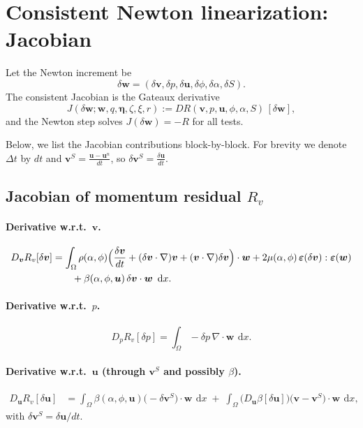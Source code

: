 \documentclass[11pt]{article}
\newcommand{\dd}{\,\mathrm{d}}
\newcommand{\grad}{\nabla}
\newcommand{\divv}{\nabla\!\cdot}
\newcommand{\eps}{\bm{\varepsilon}}
\begin{document}
\section{Consistent Newton linearization: Jacobian}

Let the Newton increment be
\[
\delta\bm{w} = (\delta\bm{v},\delta p,\delta\bm{u},\delta\phi,\delta\alpha,\delta S).
\]
The consistent Jacobian is the Gateaux derivative
\[
\boxed{
J(\delta\bm{w};\bm{w},q,\bm{\eta},\zeta,\xi,r)
:= D R(\bm{v},p,\bm{u},\phi,\alpha,S)\,[\delta\bm{w}],
}
\]
and the Newton step solves $J(\delta\bm{w}) = -R$ for all tests.

Below, we list the Jacobian contributions block-by-block. For brevity we denote $\Delta t$ by $dt$ and $\bm{v}^S=\frac{\bm{u}-\bm{u}^n}{dt}$, so $\delta \bm{v}^S=\frac{\delta\bm{u}}{dt}$.

\subsection{Jacobian of momentum residual $R_v$}

\paragraph{Derivative w.r.t.\ $\bm{v}$.}
\begin{align}
D_{\bm{v}}R_v[\delta\bm{v}] &=
\int_\Omega
\rho(\alpha,\phi)\Big(\frac{\delta\bm{v}}{dt} + (\delta\bm{v}\cdot\grad)\bm{v} + (\bm{v}\cdot\grad)\delta\bm{v}\Big)\cdot\bm{w}
+ 2\mu(\alpha,\phi)\,\eps(\delta\bm{v}):\eps(\bm{w})
\notag\\
&\qquad
+ \beta(\alpha,\phi,\bm{u})\,\delta\bm{v}\cdot\bm{w}\ \dd x.
\end{align}

\paragraph{Derivative w.r.t.\ $p$.}
\[
D_{p}R_v[\delta p] = \int_\Omega -\delta p\,\divv\bm{w}\ \dd x.
\]

\paragraph{Derivative w.r.t.\ $\bm{u}$ (through $\bm{v}^S$ and possibly $\beta$).}
\begin{align}
D_{\bm{u}}R_v[\delta\bm{u}]
&=\int_\Omega
\beta(\alpha,\phi,\bm{u})\Big(-\delta\bm{v}^S\Big)\cdot\bm{w}\ \dd x
\;+\;\int_\Omega \Big(D_{\bm{u}}\beta[\delta\bm{u}]\Big)\big(\bm{v}-\bm{v}^S\big)\cdot\bm{w}\ \dd x,
\end{align}
with $\delta\bm{v}^S=\delta\bm{u}/dt$.
\end{document}
